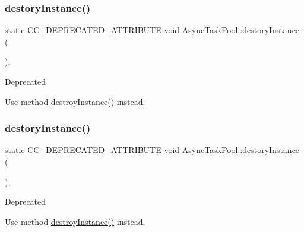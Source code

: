 \subsubsection{\texorpdfstring{destory\+Instance()}{destoryInstance()}\hspace{0.1cm}{\footnotesize\ttfamily [1/2]}}
{\footnotesize\ttfamily static C\+C\+\_\+\+D\+E\+P\+R\+E\+C\+A\+T\+E\+D\+\_\+\+A\+T\+T\+R\+I\+B\+U\+TE void Async\+Task\+Pool\+::destory\+Instance (\begin{DoxyParamCaption}{ }\end{DoxyParamCaption})\hspace{0.3cm}{\ttfamily [inline]}, {\ttfamily [static]}}

\begin{DoxyRefDesc}{Deprecated}
\item[\hyperlink{deprecated__deprecated000048}{Deprecated}]Use method \hyperlink{classAsyncTaskPool_a3197eae4bc1c9f17fa2869cf70b7bad4}{destroy\+Instance()} instead. \end{DoxyRefDesc}
\mbox{\label{classAsyncTaskPool_a9e0a8926935d80cf5ce73ac7d748a4ae}} 
\subsubsection{\texorpdfstring{destory\+Instance()}{destoryInstance()}\hspace{0.1cm}{\footnotesize\ttfamily [2/2]}}
{\footnotesize\ttfamily static C\+C\+\_\+\+D\+E\+P\+R\+E\+C\+A\+T\+E\+D\+\_\+\+A\+T\+T\+R\+I\+B\+U\+TE void Async\+Task\+Pool\+::destory\+Instance (\begin{DoxyParamCaption}{ }\end{DoxyParamCaption})\hspace{0.3cm}{\ttfamily [inline]}, {\ttfamily [static]}}

\begin{DoxyRefDesc}{Deprecated}
\item[\hyperlink{deprecated__deprecated000283}{Deprecated}]Use method \hyperlink{classAsyncTaskPool_a3197eae4bc1c9f17fa2869cf70b7bad4}{destroy\+Instance()} instead. \end{DoxyRefDesc}
\mbox{\label{classAsyncTaskPool_a3197eae4bc1c9f17fa2869cf70b7bad4}} 
